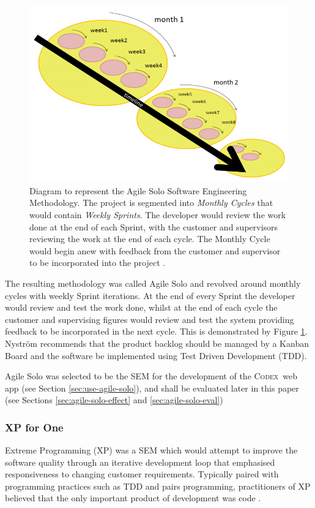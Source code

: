 \documentclass[final]{cmpreport}
\newcommand{\Codex}{\textsc{Codex}}
\begin{document}
			\begin{figure}[H]
				\centering
				\includegraphics[width=0.8\linewidth]{agile-solo.png}
				\caption[Agile Solo Diagram]{Diagram to represent the Agile Solo Software Engineering Methodology. The project is segmented into \emph{Monthly Cycles} that would contain \emph{Weekly Sprints}. The developer would review the work done at the end of each Sprint, with the customer and supervisors reviewing the work at the end of each cycle. The Monthly Cycle would begin anew with feedback from the customer and supervisor to be incorporated into the project \citep{AgileSolo}.} \label{fig:agile-solo}
			\end{figure}
			
			The resulting methodology was called Agile Solo and revolved around monthly cycles with weekly Sprint iterations. At the end of every Sprint the developer would review and test the work done, whilst at the end of each cycle the customer and supervising figures would review and test the system providing feedback to be incorporated in the next cycle. This is demonstrated by Figure \ref{fig:agile-solo}. Nystr{\"o}m recommends that the product backlog should be managed by a Kanban Board and the software be implemented using Test Driven Development (TDD). 
			
			Agile Solo was selected to be the SEM for the development of the \Codex \ web app (see Section \ref{sec:use-agile-solo}), and shall be evaluated later in this paper (see Sections \ref{sec:agile-solo-effect} and \ref{sec:agile-solo-eval})
			
			\subsubsection{XP for One} \label{sec:xp-for-one}
			Extreme Programming (XP) was a SEM which would attempt to improve the software quality through an iterative development loop that emphasised responsiveness to changing customer requirements. Typically paired with programming practices such as TDD and pairs programming, practitioners of XP believed that the only important product of development was code \citep{XP}.  
			
\end{document}
